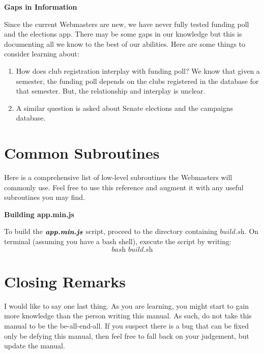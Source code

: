 \documentclass[a4paper]{article}
\begin{document}
\begin{center}
\textbf{Gaps in Information}
\end{center}

Since the current Webmasters are new, we have never fully tested funding poll and the elections app. There may be some gaps in our knowledge but this is documenting all we know to the best of our abilities. Here are some things to consider learning about:

\begin{enumerate}
  \item How does club registration interplay with funding poll? We know that given a semester, the funding poll depends on the clubs registered in the database for that semester. But, the relationship and interplay is unclear.
  \item A similar question is asked about Senate elections and the campaigns database.
\end{enumerate}

\newpage
\section{Common Subroutines}

Here is a comprehensive list of low-level subroutines the Webmasters will commonly use. Feel free to use this reference and augment it with any useful subroutines you may find.

\begin{center}
\textbf{Building app.min.js}
\end{center}

To build the $\textbf{\textit{app.min.js}}$ script, proceed to the directory containing $\textit{build.sh}$. On terminal (assuming you have a bash shell), execute the script by writing:
$$\textit{bash build.sh}$$

\newpage
\section{Closing Remarks}

I would like to say one last thing. As you are learning, you might start to gain more knowledge than the person writing this manual. As such, do not take this manual to be the be-all-end-all. If you suspect there is a bug that can be fixed only be defying this manual, then feel free to fall back on your judgement, but update the manual.
\end{document}
